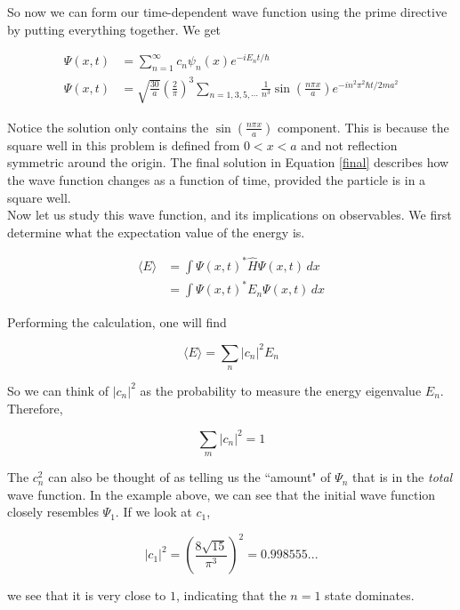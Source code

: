 So now we can form our time-dependent wave function using the prime directive by putting everything
together. We get 

\begin{align}
  \Psi(x, t) &= \sum_{n=1}^\infty c_n \psi_n(x) e^{-iE_n t / \hbar} \\ 
  \Psi(x, t) &= \sqrt{\frac{30}{a}} \left( \frac{2}{\pi} \right) ^3 \sum_{n
= 1,3,5,\cdots} \frac{1}{n^3}\sin \left( \frac{n\pi x}{a} \right) e^{-in^2\pi^2
\hbar t / 2ma^2} \label{final}
\end{align} \vspace{3px}

Notice the solution only contains the $\sin \left( \frac{n\pi x}{a} \right)$
component. This is because the square well in this problem is
defined from $0 < x < a$ and not reflection symmetric around the origin. The final
solution in Equation \ref{final} describes how the wave function changes as
a function of time, provided the particle is in a square well. \\

Now let us study this wave function, and its implications on observables. We
first determine what the expectation value of the energy is. 

\begin{align}
  \langle E \rangle &= \int \Psi(x, t)^* \hat{H} \Psi(x, t) \, dx \\ 
                    &= \int \Psi(x, t)^* E_n \Psi(x, t)\, dx
\end{align}

Performing the calculation, one will find 

\[
\langle E \rangle = \sum_n |c_n|^2 E_n
\] \vspace{3px}

So we can think of $|c_n|^2$ as the probability to measure the energy
eigenvalue $E_n$. Therefore, 

\[
\sum_m |c_n|^2 = 1
\] \vspace{3px}

The $c_n^2$ can also be thought of as telling us the ``amount" of $\Psi_n$ that
is in the \textit{total} wave function. In the example above, we can see that
the initial wave function closely resembles $\Psi_1$. If we look at $c_1$, 

\[
|c_1|^2 = \left( \frac{8\sqrt{15}}{\pi^3} \right) ^2 = 0.998555... 
\] \vspace{3px}

we see that it is very close to $1$, indicating that the $n=1$ state dominates.
\\

